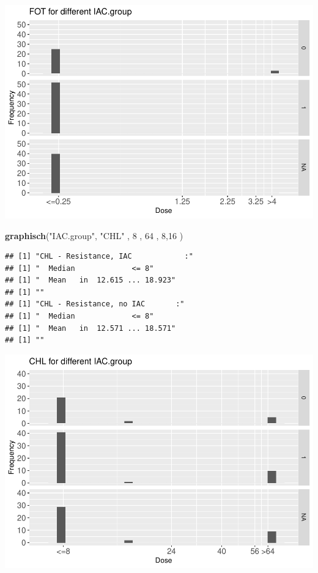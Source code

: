 \documentclass[
]{article}
\newenvironment{Shaded}{\begin{snugshade}}{\end{snugshade}}
\newcommand{\DecValTok}[1]{\textcolor[rgb]{0.00,0.00,0.81}{#1}}
\newcommand{\KeywordTok}[1]{\textcolor[rgb]{0.13,0.29,0.53}{\textbf{#1}}}
\newcommand{\NormalTok}[1]{#1}
\newcommand{\StringTok}[1]{\textcolor[rgb]{0.31,0.60,0.02}{#1}}
\begin{document}
\includegraphics{Verteilungen_files/figure-latex/unnamed-chunk-12-1.pdf}

\begin{Shaded}
\begin{Highlighting}[]
   \KeywordTok{graphisch}\NormalTok{(}\StringTok{"IAC.group"}\NormalTok{, }\StringTok{"CHL"}\NormalTok{ , }\DecValTok{8}\NormalTok{    ,  }\DecValTok{64}\NormalTok{   ,   }\DecValTok{8}\NormalTok{,}\DecValTok{16}\NormalTok{   ) }
\end{Highlighting}
\end{Shaded}

\begin{verbatim}
## [1] "CHL - Resistance, IAC            :"
## [1] "  Median             <= 8"
## [1] "  Mean   in  12.615 ... 18.923"
## [1] ""
## [1] "CHL - Resistance, no IAC       :"
## [1] "  Median             <= 8"
## [1] "  Mean   in  12.571 ... 18.571"
## [1] ""
\end{verbatim}

\includegraphics{Verteilungen_files/figure-latex/unnamed-chunk-13-1.pdf}
\end{document}
